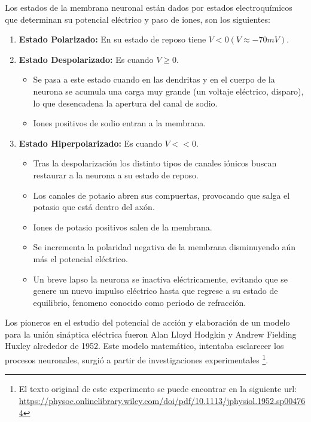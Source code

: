 Los estados de la membrana neuronal están dados por estados electroquímicos que determinan su potencial eléctrico y paso de iones, son los siguientes: 

\begin{enumerate}
 \item \textbf{Estado Polarizado:} En su estado de reposo tiene \(V < 0 ( V \approx -70 mV )\).
 \item \textbf{Estado Despolarizado:} Es cuando \(V \geq 0\).
 \begin{itemize}
  \item Se pasa a este estado cuando en las dendritas y en el cuerpo de la neurona se acumula una carga muy grande (un voltaje eléctrico, disparo), lo que desencadena la apertura del canal de sodio. 
  \item Iones positivos de sodio entran a la membrana. 
 \end{itemize}
 \item \textbf{Estado Hiperpolarizado:} Es cuando \(V << 0\).

  \begin{itemize}
    \item Tras la despolarización los distinto tipos de canales iónicos buscan restaurar a la neurona a su estado de reposo.
    \item Los canales de potasio abren sus compuertas, provocando que salga el potasio que está dentro del axón. 
    \item Iones de potasio positivos salen de la membrana.
    \item Se incrementa la polaridad negativa de la membrana disminuyendo aún más el potencial eléctrico.
    \item Un breve lapso la neurona se inactiva eléctricamente, evitando que se genere un nuevo impulso eléctrico hasta que regrese a su estado de equilibrio, fenomeno conocido como
    periodo de refracción.
 \end{itemize}

\end{enumerate}


Los pioneros en el estudio del potencial de acción y elaboración de un modelo para la unión sináptica eléctrica fueron Alan Lloyd Hodgkin y Andrew Fielding Huxley alrededor de 1952. Este modelo matemático, intentaba esclarecer los procesos neuronales, surgió a partir de investigaciones experimentales  \footnote{El texto original de este experimento se puede encontrar en la siguiente url: \url{ https://physoc.onlinelibrary.wiley.com/doi/pdf/10.1113/jphysiol.1952.sp004764}}.

